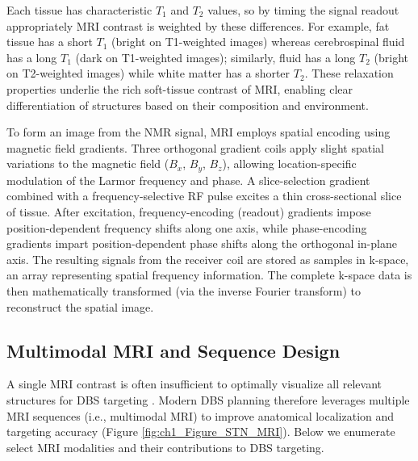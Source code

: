Each tissue has characteristic $T_1$ and $T_2$ values, so by timing the signal readout appropriately MRI contrast is weighted by these differences. For example, fat tissue has a short $T_1$ (bright on T1-weighted images) whereas cerebrospinal fluid has a long $T_1$ (dark on T1-weighted images); similarly, fluid has a long $T_2$ (bright on T2-weighted images) while white matter has a shorter $T_2$. These relaxation properties underlie the rich soft-tissue contrast of MRI, enabling clear differentiation of structures based on their composition and environment. 

To form an image from the NMR signal, MRI employs spatial encoding using magnetic field gradients. Three orthogonal gradient coils apply slight spatial variations to the magnetic field ($B_x$, $B_y$, $B_z$), allowing location-specific modulation of the Larmor frequency and phase. A slice-selection gradient combined with a frequency-selective RF pulse excites a thin cross-sectional slice of tissue. After excitation, frequency-encoding (readout) gradients impose position-dependent frequency shifts along one axis, while phase-encoding gradients impart position-dependent phase shifts along the orthogonal in-plane axis. The resulting signals from the receiver coil are stored as samples in k-space, an array representing spatial frequency information. The complete k-space data is then mathematically transformed (via the inverse Fourier transform) to reconstruct the spatial image.

\subsection{Multimodal MRI and Sequence Design}
A single MRI contrast is often insufficient to optimally visualize all relevant structures for DBS targeting \cite{Boutet2021-vg,Treu2020-ih}. Modern DBS planning therefore leverages multiple MRI sequences (i.e., multimodal MRI) to improve anatomical localization and targeting accuracy (Figure \ref{fig:ch1_Figure_STN_MRI}). Below we enumerate select MRI modalities and their contributions to DBS targeting.

